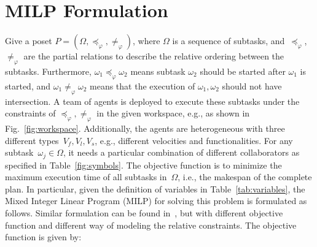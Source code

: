 
\section{MILP Formulation}
Give a poset $P=(\Omega,\preceq_{\varphi},\neq_{\varphi})$, where $\Omega$ is a sequence of
subtasks, and~$\preceq_{\varphi}$, $\neq_{\varphi}$ are the partial relations
to describe the relative ordering between the subtasks.
Furthermore, $\omega_1\preceq_{\varphi}\omega_2$ means subtask $\omega_2$ should be
started after $\omega_1$ is started,
and $\omega_1\neq_{\varphi}\omega_2$ means that the execution of $\omega_1,\omega_2$ should not have intersection.
A team of agents is deployed to execute these subtasks under the constraints of
$\preceq_{\varphi},\neq_{\varphi}$ in the given workspace, e.g., as shown in Fig.~\ref{fig:workspace}.
Additionally, the agents are heterogeneous with three different types~$V_f,V_l,V_s$,
e.g., different velocities and functionalities.
For any subtask~$\omega_j\in\Omega$, it needs a particular combination of
different collaborators as specified in Table~\ref{fig:symbols}.
The objective function is to minimize the maximum execution time of
all subtasks in~$\Omega$, i.e., the makespan of the complete plan.
In particular, given the definition of variables in Table~\ref{tab:variables},
the Mixed Integer Linear Program (MILP) for solving this problem is formulated as follows.
Similar formulation can be found in~\cite{luo2021temporal, jones2019scratchs},
but with different objective function and different way of modeling the relative constraints.
The objective function is given by:
